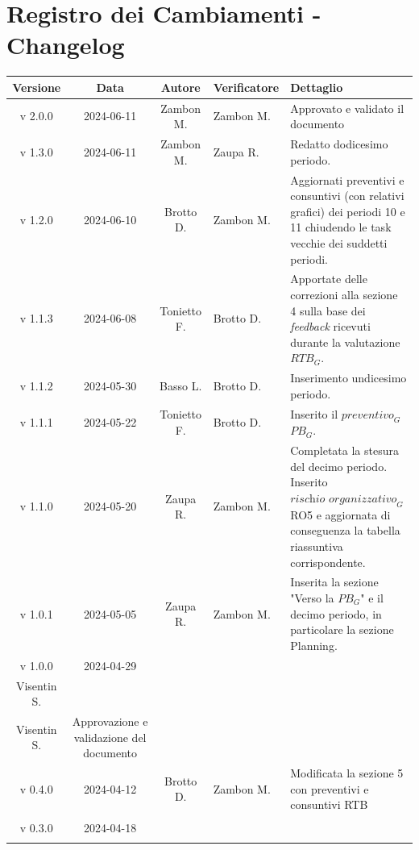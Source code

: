 \documentclass[12pt, oneside]{article}
\begin{document}
\section*{Registro dei Cambiamenti - Changelog}
\begin{longtable}{|c|c|c|p{3cm}|p{6cm}|}
\hline
\textbf{Versione} & \textbf{Data} & \textbf{Autore} & \textbf{Verificatore} & \textbf{Dettaglio} \\
\hline
v 2.0.0 & 2024-06-11 & Zambon M. & Zambon M. & Approvato e validato il documento \\
\hline
v 1.3.0 & 2024-06-11 & Zambon M. & Zaupa R. & Redatto dodicesimo periodo. \\
\hline
v 1.2.0 & 2024-06-10 & Brotto D. & Zambon M. & Aggiornati preventivi e consuntivi (con relativi grafici) dei periodi 10 e 11 chiudendo le task vecchie dei suddetti periodi. \\
\hline
v 1.1.3 & 2024-06-08 & Tonietto F. & Brotto D. & Apportate delle correzioni alla sezione 4 sulla base dei \textit{feedback} ricevuti durante la valutazione $\textit{RTB}_G$. \\
\hline
v 1.1.2 & 2024-05-30 & Basso L. & Brotto D. & Inserimento undicesimo periodo. \\
\hline
v 1.1.1 & 2024-05-22 & Tonietto F. & Brotto D. & Inserito il $\textit{preventivo}_G$ $\textit{PB}_G$. \\
\hline
v 1.1.0 & 2024-05-20 & Zaupa R. & Zambon M. & Completata la stesura del decimo periodo. Inserito $\textit{rischio organizzativo}_G$ RO5 e aggiornata di conseguenza la tabella riassuntiva corrispondente.\\
\hline
v 1.0.1 & 2024-05-05 & Zaupa R. & Zambon M. & Inserita la sezione "Verso la $\textit{PB}_G$" e il decimo periodo, in particolare la sezione Planning.\\
\hline
v 1.0.0 & 2024-04-29 & \begin{tabular}[c]{@{}c@{}}
    Zaupa R. \\
    Visentin S.
  \end{tabular} & \begin{tabular}[c]{@{}c@{}}
    Zaupa R. \\
    Visentin S.
  \end{tabular} & Approvazione e validazione del documento\\
\hline
v 0.4.0 & 2024-04-12 & Brotto D. & Zambon M. & Modificata la sezione 5 con preventivi e consuntivi RTB\\
\hline
v 0.3.0 & 2024-04-18 & \begin{tabular}[c]{@{}c@{}}

\end{tabular}
\end{longtable}
\end{document}
